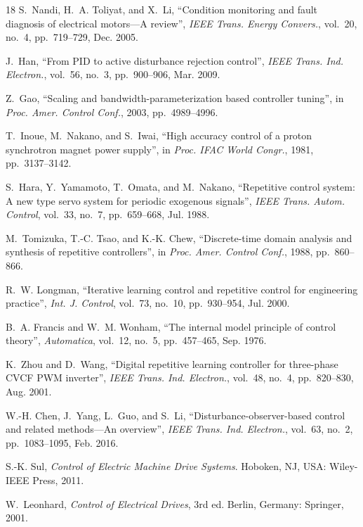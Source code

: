 \documentclass[journal]{IEEEtran}
\theoremstyle{remark}
\newcommand{\qq}[1]{\textquotedblleft#1\textquotedblright}
\begin{document}
\begin{thebibliography}{18}
S.~Nandi, H.~A. Toliyat, and X.~Li, \qq{Condition monitoring and fault diagnosis of
electrical motors---A review}, \emph{IEEE Trans. Energy Convers.}, vol.~20, no.~4,
pp.~719--729, Dec. 2005.

J.~Han, \qq{From PID to active disturbance rejection control}, \emph{IEEE Trans. Ind.
Electron.}, vol.~56, no.~3, pp.~900--906, Mar. 2009.

Z.~Gao, \qq{Scaling and bandwidth-parameterization based controller tuning}, in
\emph{Proc. Amer. Control Conf.}, 2003, pp.~4989--4996.

T.~Inoue, M.~Nakano, and S.~Iwai, \qq{High accuracy control of a proton synchrotron
magnet power supply}, in \emph{Proc. IFAC World Congr.}, 1981, pp.~3137--3142.

S.~Hara, Y.~Yamamoto, T.~Omata, and M.~Nakano, \qq{Repetitive control system: A new
type servo system for periodic exogenous signals}, \emph{IEEE Trans. Autom. Control},
vol.~33, no.~7, pp.~659--668, Jul. 1988.

M.~Tomizuka, T.-C. Tsao, and K.-K. Chew, \qq{Discrete-time domain analysis and
synthesis of repetitive controllers}, in \emph{Proc. Amer. Control Conf.}, 1988,
pp.~860--866.

R.~W. Longman, \qq{Iterative learning control and repetitive control for engineering
practice}, \emph{Int. J. Control}, vol.~73, no.~10, pp.~930--954, Jul. 2000.

B.~A. Francis and W.~M. Wonham, \qq{The internal model principle of control theory},
\emph{Automatica}, vol.~12, no.~5, pp.~457--465, Sep. 1976.

K.~Zhou and D.~Wang, \qq{Digital repetitive learning controller for three-phase CVCF
PWM inverter}, \emph{IEEE Trans. Ind. Electron.}, vol.~48, no.~4, pp.~820--830,
Aug. 2001.

W.-H. Chen, J.~Yang, L.~Guo, and S.~Li, \qq{Disturbance-observer-based control and
related methods---An overview}, \emph{IEEE Trans. Ind. Electron.}, vol.~63, no.~2,
pp.~1083--1095, Feb. 2016.

S.-K. Sul, \emph{Control of Electric Machine Drive Systems}. Hoboken, NJ, USA:
Wiley-IEEE Press, 2011.

W.~Leonhard, \emph{Control of Electrical Drives}, 3rd ed. Berlin, Germany: Springer,
2001.


\end{thebibliography}
\end{document}
